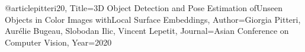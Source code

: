 @article{pitteri20,
Title={3D Object Detection and Pose Estimation ofUnseen Objects in Color Images withLocal Surface Embeddings},
Author={Giorgia Pitteri, Aurélie Bugeau, Slobodan Ilic, Vincent Lepetit},
Journal={Asian Conference on Computer Vision},
Year={2020}} 
